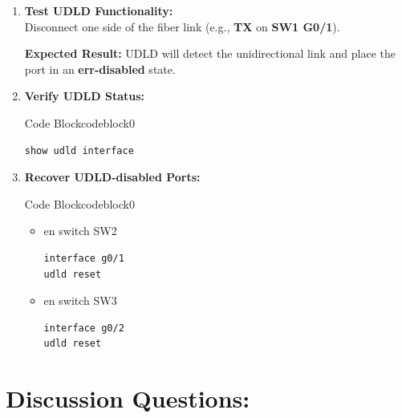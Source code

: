 \documentclass[a4paper]{book}
\begin{document}
\begin{enumerate}
	\item \textbf{Test UDLD Functionality:} \\
	      Disconnect one side of the fiber link (e.g., \textbf{TX} on \textbf{SW1 G0/1}).

	      \textbf{Expected Result:} UDLD will detect the unidirectional link and place the port in an \textbf{err-disabled} state.

	\item \textbf{Verify UDLD Status:}



	      \begin{ocg}{Code Block}{codeblock}{0}
		      \vspace{0.5cm}
		      \begin{lstlisting}
show udld interface
    \end{lstlisting}
	      \end{ocg}

	\item \textbf{Recover UDLD-disabled Ports:}



	      \begin{ocg}{Code Block}{codeblock}{0}
		      \vspace{0.5cm}
		      \begin{itemize}
			      \item en switch SW2
			            \begin{lstlisting}
interface g0/1  
udld reset
                \end{lstlisting}
			      \item en switch SW3
			            \begin{lstlisting}
interface g0/2
udld reset
                \end{lstlisting}
		      \end{itemize}
	      \end{ocg}
\end{enumerate}

\section*{Discussion Questions:}
\end{document}
